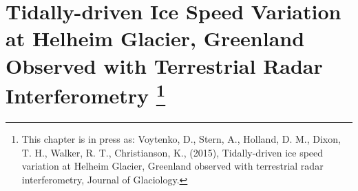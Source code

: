 % 
% 
% 
% 
% 
% 
% 
% 
% 
% 
% 
% 
% 

% 

\chapter[Tidally-driven Ice Speed Variation at Helheim Glacier, Greenland Observed with Terrestrial Radar Interferometry ]{Tidally-driven Ice Speed Variation at Helheim Glacier, Greenland Observed with Terrestrial Radar Interferometry \footnote{This chapter is in press as: Voytenko, D., Stern, A., Holland, D. M., Dixon, T. H., Walker, R. T., Christianson, K., (2015), Tidally-driven ice speed variation at Helheim Glacier, Greenland observed with terrestrial radar interferometry, Journal of Glaciology.}}


